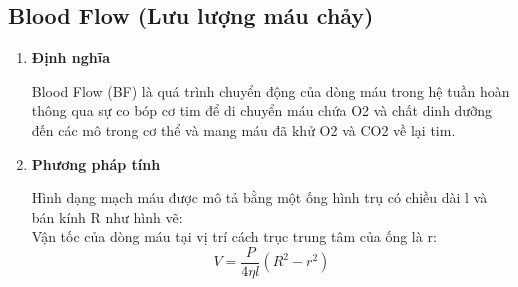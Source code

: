 \documentclass[12pt,a4paper]{article}
\begin{document}
\subsection{Blood Flow (Lưu lượng máu chảy)}
\begin{enumerate} [a/]
	\item \textbf{Định nghĩa}
	      \begin{flushleft}
		      Blood Flow (BF) là quá trình chuyển động của dòng máu trong hệ tuần hoàn thông qua sự co bóp cơ tim để di chuyển máu chứa O2 và chất dinh dưỡng đến các mô trong cơ thể và mang máu đã khử O2 và CO2 về lại tim.
	      \end{flushleft}
	\item \textbf{Phương pháp tính }
	      \begin{flushleft}
		      Hình dạng mạch máu được mô tả bằng một ống hình trụ có chiều dài l và bán kính R như hình vẽ:\\
		      Vận tốc của dòng máu tại vị trí cách trục trung tâm của ống là r: $$V=\frac{P}{4\eta l}(R^2-r^2)$$ \\


\end{flushleft}
\end{enumerate}
\end{document}
